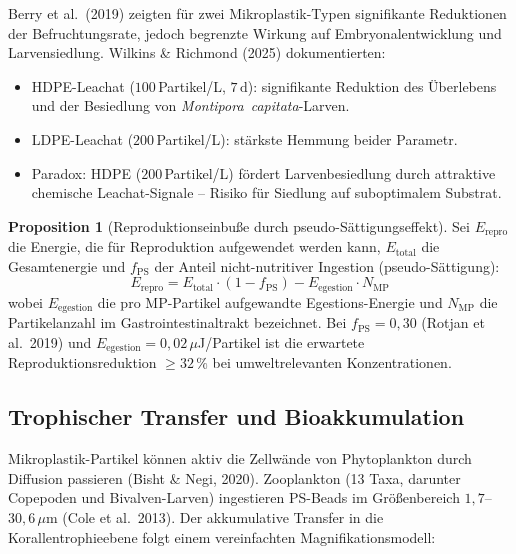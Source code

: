 ﻿\documentclass[12pt,a4paper]{article}
\theoremstyle{definition}
\newtheorem{proposition}{Proposition}[section]
\theoremstyle{remark}
\newcommand{\MP}{Mikroplastik}
\begin{document}
Berry et al.\ (2019) zeigten f\"ur zwei \MP{}-Typen signifikante Reduktionen
der Befruchtungsrate, jedoch begrenzte Wirkung auf Embryonalentwicklung und
Larvensiedlung. Wilkins \& Richmond (2025) dokumentierten:
\begin{itemize}[noitemsep]
  \item HDPE-Leachat ($100$\,Partikel/L, $7\,\text{d}$): signifikante Reduktion
    des Überlebens und der Besiedlung von \textit{Montipora~capitata}-Larven.
  \item LDPE-Leachat ($200$\,Partikel/L): st\"arkste Hemmung beider Parametr.
  \item Paradox: HDPE ($200$\,Partikel/L) f\"ordert Larvenbesiedlung durch
    attraktive chemische Leachat-Signale -- Risiko für Siedlung auf suboptimalem Substrat.
\end{itemize}

\begin{proposition}[Reproduktionseinbuße durch pseudo-Sättigungseffekt]
Sei $E_{\text{repro}}$ die Energie, die für Reproduktion aufgewendet werden kann,
$E_{\text{total}}$ die Gesamtenergie und $f_{\text{PS}}$ der Anteil
nicht-nutritiver Ingestion (pseudo-Sättigung):
\begin{equation}
  E_{\text{repro}} = E_{\text{total}} \cdot (1 - f_{\text{PS}}) -
                     E_{\text{egestion}} \cdot N_{\text{MP}}
  \label{eq:repro_energy}
\end{equation}
wobei $E_{\text{egestion}}$ die pro MP-Partikel aufgewandte Egestions-Energie und
$N_{\text{MP}}$ die Partikelanzahl im Gastrointestinaltrakt bezeichnet.
Bei $f_{\text{PS}} = 0{,}30$ (Rotjan et al.\ 2019) und
$E_{\text{egestion}} = 0{,}02\,\mu$J/Partikel ist die erwartete Reproduktionsreduktion
$\geq 32\,\%$ bei umweltrelevanten Konzentrationen.
\end{proposition}

\subsection{Trophischer Transfer und Bioakkumulation}
\label{subsec:trophic}

\MP{}-Partikel k\"onnen aktiv die Zellw\"ande von Phytoplankton durch Diffusion
passieren (Bisht \& Negi, 2020). Zooplankton (13 Taxa, darunter Copepoden und
Bivalven-Larven) ingestieren PS-Beads im Gr\"o\ss{}enbereich
$1{,}7$--$30{,}6\,\mu$m (Cole et al.\ 2013). Der akkumulative Transfer in die
Korallentrophieebene folgt einem vereinfachten Magnifikationsmodell:
\end{document}
